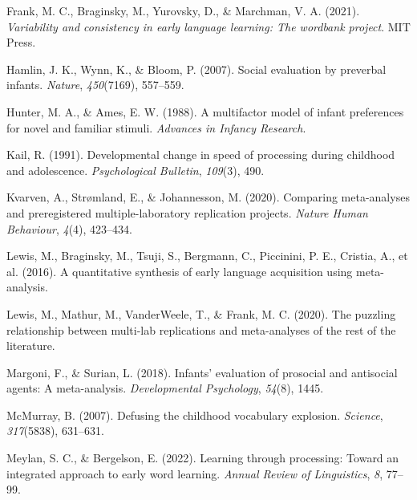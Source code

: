 \documentclass[10pt, letterpaper]{article}
\newenvironment{CSLReferences}%
  {}%
  {\par}
\begin{document}
\begin{CSLReferences}{1}{0}
\leavevmode{}%
Frank, M. C., Braginsky, M., Yurovsky, D., \& Marchman, V. A. (2021).
\emph{Variability and consistency in early language learning: The
wordbank project}. MIT Press.

\leavevmode{}%
Hamlin, J. K., Wynn, K., \& Bloom, P. (2007). Social evaluation by
preverbal infants. \emph{Nature}, \emph{450}(7169), 557--559.

\leavevmode{}%
Hunter, M. A., \& Ames, E. W. (1988). A multifactor model of infant
preferences for novel and familiar stimuli. \emph{Advances in Infancy
Research}.

\leavevmode{}%
Kail, R. (1991). Developmental change in speed of processing during
childhood and adolescence. \emph{Psychological Bulletin}, \emph{109}(3),
490.

\leavevmode{}%
Kvarven, A., Strømland, E., \& Johannesson, M. (2020). Comparing
meta-analyses and preregistered multiple-laboratory replication
projects. \emph{Nature Human Behaviour}, \emph{4}(4), 423--434.

\leavevmode{}%
Lewis, M., Braginsky, M., Tsuji, S., Bergmann, C., Piccinini, P. E.,
Cristia, A., et al. (2016). A quantitative synthesis of early language
acquisition using meta-analysis.

\leavevmode{}%
Lewis, M., Mathur, M., VanderWeele, T., \& Frank, M. C. (2020). The
puzzling relationship between multi-lab replications and meta-analyses
of the rest of the literature.

\leavevmode{}%
Margoni, F., \& Surian, L. (2018). Infants' evaluation of prosocial and
antisocial agents: A meta-analysis. \emph{Developmental Psychology},
\emph{54}(8), 1445.

\leavevmode{}%
McMurray, B. (2007). Defusing the childhood vocabulary explosion.
\emph{Science}, \emph{317}(5838), 631--631.

\leavevmode{}%
Meylan, S. C., \& Bergelson, E. (2022). Learning through processing:
Toward an integrated approach to early word learning. \emph{Annual
Review of Linguistics}, \emph{8}, 77--99.


\end{CSLReferences}
\end{document}
